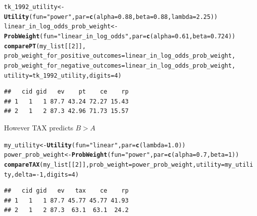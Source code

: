 \documentclass{article}\usepackage[]{graphicx}\usepackage[]{color}
\makeatletter
\newcommand{\hlnum}[1]{\textcolor[rgb]{0.686,0.059,0.569}{#1}}%
\newcommand{\hlstr}[1]{\textcolor[rgb]{0.192,0.494,0.8}{#1}}%
\newcommand{\hlopt}[1]{\textcolor[rgb]{0,0,0}{#1}}%
\newcommand{\hlstd}[1]{\textcolor[rgb]{0.345,0.345,0.345}{#1}}%
\newcommand{\hlkwb}[1]{\textcolor[rgb]{0.69,0.353,0.396}{#1}}%
\newcommand{\hlkwc}[1]{\textcolor[rgb]{0.333,0.667,0.333}{#1}}%
\newcommand{\hlkwd}[1]{\textcolor[rgb]{0.737,0.353,0.396}{\textbf{#1}}}%
\newenvironment{kframe}{%
 \def\at@end@of@kframe{}%
 \ifinner\ifhmode%
  \def\at@end@of@kframe{\end{minipage}}%
  \begin{minipage}{\columnwidth}%
 \fi\fi%
 \def\FrameCommand##1{\hskip\@totalleftmargin \hskip-\fboxsep
 \colorbox{shadecolor}{##1}\hskip-\fboxsep
     \hskip-\linewidth \hskip-\@totalleftmargin \hskip\columnwidth}%
 \MakeFramed {\advance\hsize-\width
   \@totalleftmargin\z@ \linewidth\hsize
   \@setminipage}}%
 {\par\unskip\endMakeFramed%
 \at@end@of@kframe}
\newenvironment{knitrout}{}{} %
\makeatother
\begin{document}
\begin{knitrout}
\color{fgcolor}\begin{kframe}
\begin{alltt}
\hlstd{tk_1992_utility} \hlkwb{<-} \hlkwd{Utility}\hlstd{(}\hlkwc{fun}\hlstd{=}\hlstr{"power"}\hlstd{,} \hlkwc{par}\hlstd{=}\hlkwd{c}\hlstd{(}\hlkwc{alpha}\hlstd{=}\hlnum{0.88}\hlstd{,} \hlkwc{beta}\hlstd{=}\hlnum{0.88}\hlstd{,} \hlkwc{lambda}\hlstd{=}\hlnum{2.25}\hlstd{))}
\hlstd{linear_in_log_odds_prob_weight} \hlkwb{<-} \hlkwd{ProbWeight}\hlstd{(}\hlkwc{fun}\hlstd{=}\hlstr{"linear_in_log_odds"}\hlstd{,} \hlkwc{par}\hlstd{=}\hlkwd{c}\hlstd{(}\hlkwc{alpha}\hlstd{=}\hlnum{0.61}\hlstd{,} \hlkwc{beta}\hlstd{=}\hlnum{0.724}\hlstd{))}
\hlkwd{comparePT}\hlstd{(my_list[[}\hlnum{2}\hlstd{]],}
        \hlkwc{prob_weight_for_positive_outcomes}\hlstd{=linear_in_log_odds_prob_weight,}
        \hlkwc{prob_weight_for_negative_outcomes}\hlstd{=linear_in_log_odds_prob_weight,}
        \hlkwc{utility}\hlstd{=tk_1992_utility,} \hlkwc{digits}\hlstd{=}\hlnum{4}\hlstd{)}
\end{alltt}
\begin{verbatim}
##   cid gid   ev    pt    ce    rp
## 1   1   1 87.7 43.24 72.27 15.43
## 2   1   2 87.3 42.96 71.73 15.57
\end{verbatim}
\end{kframe}
\end{knitrout}


However TAX predicts $B > A$

\begin{knitrout}
\color{fgcolor}\begin{kframe}
\begin{alltt}
\hlstd{my_utility} \hlkwb{<-} \hlkwd{Utility}\hlstd{(}\hlkwc{fun}\hlstd{=}\hlstr{"linear"}\hlstd{,} \hlkwc{par}\hlstd{=}\hlkwd{c}\hlstd{(}\hlkwc{lambda}\hlstd{=}\hlnum{1.0}\hlstd{))}
\hlstd{power_prob_weight} \hlkwb{<-} \hlkwd{ProbWeight}\hlstd{(}\hlkwc{fun}\hlstd{=}\hlstr{"power"}\hlstd{,} \hlkwc{par}\hlstd{=}\hlkwd{c}\hlstd{(}\hlkwc{alpha}\hlstd{=}\hlnum{0.7}\hlstd{,} \hlkwc{beta}\hlstd{=}\hlnum{1}\hlstd{))}
\hlkwd{compareTAX}\hlstd{(my_list[[}\hlnum{2}\hlstd{]],} \hlkwc{prob_weight}\hlstd{=power_prob_weight,} \hlkwc{utility}\hlstd{=my_utility,} \hlkwc{delta}\hlstd{=}\hlopt{-}\hlnum{1}\hlstd{,} \hlkwc{digits}\hlstd{=}\hlnum{4}\hlstd{)}
\end{alltt}
\begin{verbatim}
##   cid gid   ev   tax    ce    rp
## 1   1   1 87.7 45.77 45.77 41.93
## 2   1   2 87.3  63.1  63.1  24.2
\end{verbatim}
\end{kframe}
\end{knitrout}
\end{document}
